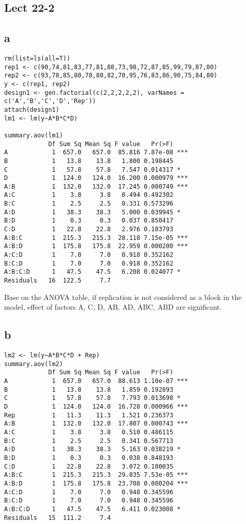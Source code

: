 \documentclass[11pt,letterpaper]{article}
\begin{document}
\newpage
\subsection*{Lect 22-2}
\subsection*{a}
\begin{verbatim}
rm(list=ls(all=T))
rep1 <- c(90,74,81,83,77,81,88,73,98,72,87,85,99,79,87,80)
rep2 <- c(93,78,85,80,78,80,82,70,95,76,83,86,90,75,84,80)
y <- c(rep1, rep2)
design1 <- gen.factorial(c(2,2,2,2,2), varNames = c('A','B','C','D','Rep'))
attach(design1)
lm1 <- lm(y~A*B*C*D)

summary.aov(lm1)
            Df Sum Sq Mean Sq F value   Pr(>F)    
A            1  657.0   657.0  85.816 7.87e-08 ***
B            1   13.8    13.8   1.800 0.198445    
C            1   57.8    57.8   7.547 0.014317 *  
D            1  124.0   124.0  16.200 0.000979 ***
A:B          1  132.0   132.0  17.245 0.000749 ***
A:C          1    3.8     3.8   0.494 0.492302    
B:C          1    2.5     2.5   0.331 0.573296    
A:D          1   38.3    38.3   5.000 0.039945 *  
B:D          1    0.3     0.3   0.037 0.850417    
C:D          1   22.8    22.8   2.976 0.103793    
A:B:C        1  215.3   215.3  28.118 7.15e-05 ***
A:B:D        1  175.8   175.8  22.959 0.000200 ***
A:C:D        1    7.0     7.0   0.918 0.352162    
B:C:D        1    7.0     7.0   0.918 0.352162    
A:B:C:D      1   47.5    47.5   6.208 0.024077 *  
Residuals   16  122.5     7.7      
\end{verbatim}

\noindent Base on the ANOVA table, if replication is not considered as a block in the model, effect of factors A, C, D, AB, AD, ABC, ABD are significant.

\subsection*{b}
\begin{verbatim}
lm2 <- lm(y~A*B*C*D + Rep)
summary.aov(lm2)
            Df Sum Sq Mean Sq F value   Pr(>F)    
A            1  657.0   657.0  88.613 1.10e-07 ***
B            1   13.8    13.8   1.859 0.192893    
C            1   57.8    57.8   7.793 0.013690 *  
D            1  124.0   124.0  16.728 0.000966 ***
Rep          1   11.3    11.3   1.521 0.236373    
A:B          1  132.0   132.0  17.807 0.000743 ***
A:C          1    3.8     3.8   0.510 0.486115    
B:C          1    2.5     2.5   0.341 0.567713    
A:D          1   38.3    38.3   5.163 0.038219 *  
B:D          1    0.3     0.3   0.038 0.848193    
C:D          1   22.8    22.8   3.072 0.100035    
A:B:C        1  215.3   215.3  29.035 7.53e-05 ***
A:B:D        1  175.8   175.8  23.708 0.000204 ***
A:C:D        1    7.0     7.0   0.948 0.345596    
B:C:D        1    7.0     7.0   0.948 0.345596    
A:B:C:D      1   47.5    47.5   6.411 0.023008 *  
Residuals   15  111.2     7.4   
\end{verbatim}
\end{document}
